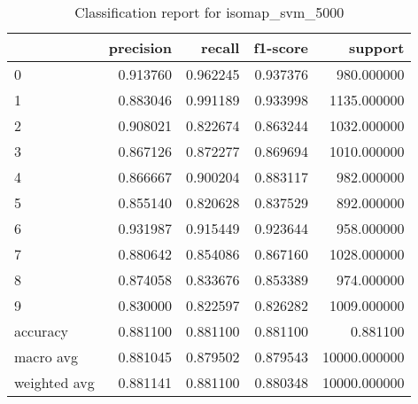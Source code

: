 \begin{table}[htb!]
\centering
\caption{Classification report for isomap_svm_5000}
\label{tab:classification-report-isomap_svm_5000}
\begin{tabular}{lrrrr}
\toprule
 & precision & recall & f1-score & support \\
\midrule
0 & 0.913760 & 0.962245 & 0.937376 & 980.000000 \\
1 & 0.883046 & 0.991189 & 0.933998 & 1135.000000 \\
2 & 0.908021 & 0.822674 & 0.863244 & 1032.000000 \\
3 & 0.867126 & 0.872277 & 0.869694 & 1010.000000 \\
4 & 0.866667 & 0.900204 & 0.883117 & 982.000000 \\
5 & 0.855140 & 0.820628 & 0.837529 & 892.000000 \\
6 & 0.931987 & 0.915449 & 0.923644 & 958.000000 \\
7 & 0.880642 & 0.854086 & 0.867160 & 1028.000000 \\
8 & 0.874058 & 0.833676 & 0.853389 & 974.000000 \\
9 & 0.830000 & 0.822597 & 0.826282 & 1009.000000 \\
accuracy & 0.881100 & 0.881100 & 0.881100 & 0.881100 \\
macro avg & 0.881045 & 0.879502 & 0.879543 & 10000.000000 \\
weighted avg & 0.881141 & 0.881100 & 0.880348 & 10000.000000 \\
\bottomrule
\end{tabular}
\end{table}
